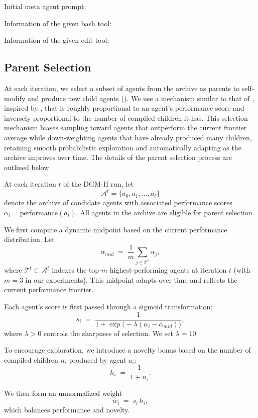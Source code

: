 \documentclass[]{fairmeta}
\begin{document}
Initial meta agent prompt:


Information of the given bash tool:


Information of the given edit tool:


\subsection{Parent Selection}
\label{app:parent-selection}

At each iteration, we select a subset of agents from the archive as parents to self-modify and produce new child agents (). We use a mechanism similar to that of \citet{zhang2025darwin}, inspired by \citet{ecoffet2019go}, that is roughly proportional to an agent's performance score and inversely proportional to the number of compiled children it has. This selection mechanism biases sampling toward agents that outperform the current frontier average while down-weighting agents that have already produced many children, retaining smooth probabilistic exploration and automatically adapting as the archive improves over time. The details of the parent selection process are outlined below.

At each iteration \(t\) of the DGM-H run, let
\[
\mathcal{A}^t = \{a_0, a_1, \dots, a_t\}
\]
denote the archive of candidate agents with associated performance scores
\(\alpha_i = \mathrm{performance}(a_i)\).
All agents in the archive are eligible for parent selection.

We first compute a dynamic midpoint based on the current performance distribution. Let
\[
\alpha_{mid} \;=\; \frac{1}{m}\sum_{j \in \mathcal{T}^t} \alpha_j,
\]
where \(\mathcal{T}^t \subset \mathcal{A}^t\) indexes the top-\(m\) highest-performing agents at iteration \(t\) (with \(m=3\) in our experiments).
This midpoint adapts over time and reflects the current performance frontier.

Each agent's score is first passed through a sigmoid transformation:
\[
s_i \;=\; \frac{1}{1 + \exp\!\bigl(-\lambda(\alpha_i - \alpha_{mid})\bigr)},
\]
where \(\lambda > 0\) controls the sharpness of selection. We set \(\lambda = 10\).

To encourage exploration, we introduce a novelty bonus based on the number of compiled children \(n_i\) produced by agent \(a_i\):
\[
h_i \;=\; \frac{1}{1 + n_i}.
\]

We then form an unnormalized weight
\[
w_i \;=\; s_i \, h_i,
\]
which balances performance and novelty.
\end{document}
